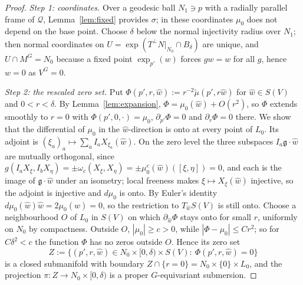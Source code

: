 \begin{proof}
\emph{Step 1: coordinates.} Over a geodesic ball $N_1\ni p$ with a radially parallel frame of
$\mathcal Q$, Lemma~\ref{lem:fixed} provides $\sigma$; in these coordinates $\mu_0$ does not
depend on the base point. Choose $\delta$ below the normal injectivity radius over $N_1$; then
normal coordinates on $U=\exp(T^\perp N|_{N_0}\cap B_\delta)$ are unique, and $U\cap M^G=N_0$
because a fixed point $\exp_{p'}(w)$ forces $gw=w$ for all $g$, hence $w=0$ as $V^G=0$.

\emph{Step 2: the rescaled zero set.} Put $\Phi(p',r,\hat w):=r^{-2}\widetilde\mu(p',r\hat w)$
for $\hat w\in S(V)$ and $0<r<\delta$. By Lemma~\ref{lem:expansion},
$\Phi=\mu_0(\hat w)+O(r^2)$, so $\Phi$ extends smoothly to $r=0$ with $\Phi(p',0,\cdot)=\mu_0$,
$\partial_{p'}\Phi=0$ and $\partial_r\Phi=0$ there. We show that the differential of $\mu_0$ in
the $\hat w$-direction is onto at every point of $L_0$. Its adjoint is
$(\xi_a)_a\mapsto\sum_aI_aX_{\xi_a}(\hat w)$. On the zero level the three subspaces
$I_a\mathfrak g\cdot\hat w$ are mutually orthogonal, since
$g(I_aX_\xi,I_bX_\eta)=\pm\omega_c(X_\xi,X_\eta)=\pm\mu_0^c(\hat w)([\xi,\eta])=0$, and each is
the image of $\mathfrak g\cdot\hat w$ under an isometry; local freeness makes
$\xi\mapsto X_\xi(\hat w)$ injective, so the adjoint is injective and $d\mu_0$ is onto. By Euler's
identity $d\mu_0(\hat w)\hat w=2\mu_0(\hat w)=0$, so the restriction to $T_{\hat w}S(V)$ is still
onto. Choose a neighbourhood $O$ of $L_0$ in $S(V)$ on which $\partial_{\hat w}\Phi$ stays onto
for small $r$, uniformly on $N_0$ by compactness. Outside $O$, $|\mu_0|\ge c>0$, while
$|\Phi-\mu_0|\le Cr^2$; so for $C\delta^2<c$ the function $\Phi$ has no zeros outside $O$.
Hence its zero set
\[
 Z:=\{(p',r,\hat w)\in N_0\times[0,\delta)\times S(V):\ \Phi(p',r,\hat w)=0\}
\]
is a closed submanifold with boundary $Z\cap\{r=0\}=N_0\times\{0\}\times L_0$, and the
projection $\pi:Z\to N_0\times[0,\delta)$ is a proper $G$-equivariant submersion.


\end{proof}
